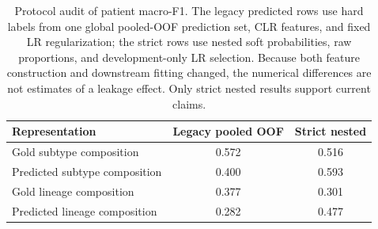 \begin{table}[H]
\centering
\small
\begin{tabular}{lcc}
\toprule
Representation & Legacy pooled OOF & Strict nested \\
\midrule
Gold subtype composition & 0.572 & 0.516 \\
Predicted subtype composition & 0.400 & 0.593 \\
Gold lineage composition & 0.377 & 0.301 \\
Predicted lineage composition & 0.282 & 0.477 \\
\bottomrule
\end{tabular}
\caption{Protocol audit of patient macro-F1. The legacy predicted rows use hard labels from one global pooled-OOF prediction set, CLR features, and fixed LR regularization; the strict rows use nested soft probabilities, raw proportions, and development-only LR selection. Because both feature construction and downstream fitting changed, the numerical differences are not estimates of a leakage effect. Only strict nested results support current claims.}
\label{tab:composition_protocol_audit}
\end{table}
